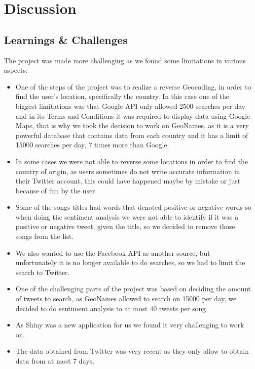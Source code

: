 \documentclass{article}
\begin{document}
\section{Discussion}
\subsection{Learnings \& Challenges}


The project was made more challenging as we found some limitations in various aspects:
\begin{itemize}
\item One of the steps of the project was to realize a reverse Geocoding, in order to find the user's location, specifically the country.  In this case one of the biggest limitations was that Google API only allowed 2500 searches per day and in its Terms and Conditions it was required to display data using Google Maps, that is why we took the decision to work on GeoNames, as it is a very powerful database that contains data from each country and it has a limit of 15000 searches per day, 7 times more than Google.

\item In some cases we were not able to reverse some locations in order to find the country of origin, as users sometimes do not write accurate information in their Twitter account, this could have happened maybe by mistake or just because of fun by the user.

\item Some of the songs titles had words that denoted positive or negative words so when doing the sentiment analysis we were not able to identify if it was a positive or negative tweet, given the title, so we decided to remove those songs from the list.

\item We also wanted to use the Facebook API as another source, but unfortunately it is no longer available to do searches, so we had to limit the search to Twitter.

\item One of the challenging parts of the project was based on deciding the amount of tweets to search, as GeoNames allowed to search on 15000 per day, we decided to do sentiment analysis to at most 40 tweets per song.

\item As Shiny was a new application for us we found it very challenging to work on.

\item The data obtained from Twitter was very recent as they only allow to obtain data from at most 7 days.


\end{itemize}
\end{document}
